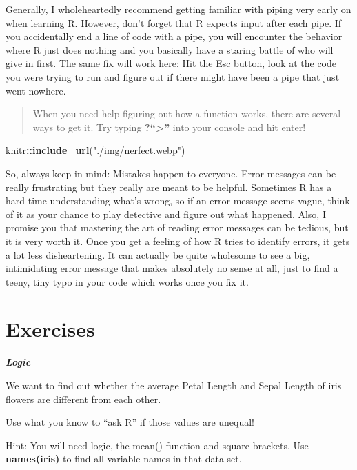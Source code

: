 \documentclass[
]{book}
\newenvironment{Shaded}{\begin{snugshade}}{\end{snugshade}}
\newcommand{\FunctionTok}[1]{\textcolor[rgb]{0.13,0.29,0.53}{\textbf{#1}}}
\newcommand{\NormalTok}[1]{#1}
\newcommand{\SpecialCharTok}[1]{\textcolor[rgb]{0.81,0.36,0.00}{\textbf{#1}}}
\newcommand{\StringTok}[1]{\textcolor[rgb]{0.31,0.60,0.02}{#1}}
\begin{document}
Generally, I wholeheartedly recommend getting familiar with piping very early on when learning R.
However, don't forget that R expects input after each pipe.
If you accidentally end a line of code with a pipe, you will encounter the behavior where R just does nothing and you basically have a staring battle of who will give in first.
The same fix will work here: Hit the Esc button, look at the code you were trying to run and figure out if there might have been a pipe that just went nowhere.

\begin{quote}
When you need help figuring out how a function works, there are several ways to get it. Try typing \textbf{?``\textbar\textgreater{}'' } into your console and hit enter!
\end{quote}

\begin{Shaded}
\begin{Highlighting}[]
\NormalTok{knitr}\SpecialCharTok{::}\FunctionTok{include\_url}\NormalTok{(}\StringTok{"./img/nerfect.webp"}\NormalTok{)}
\end{Highlighting}
\end{Shaded}

So, always keep in mind: Mistakes happen to everyone.
Error messages can be really frustrating but they really are meant to be helpful.
Sometimes R has a hard time understanding what's wrong, so if an error message seems vague, think of it as your chance to play detective and figure out what happened.
Also, I promise you that mastering the art of reading error messages can be tedious, but it is very worth it.
Once you get a feeling of how R tries to identify errors, it gets a lot less disheartening.
It can actually be quite wholesome to see a big, intimidating error message that makes absolutely no sense at all, just to find a teeny, tiny typo in your code which works once you fix it.

\section*{Exercises}\label{exercises}

\textbf{\emph{Logic}}

We want to find out whether the average Petal Length and Sepal Length of iris flowers are different from each other.

Use what you know to ``ask R'' if those values are unequal!

Hint: You will need logic, the mean()-function and square brackets. Use \textbf{names(iris)} to find all variable names in that data set.
\end{document}
